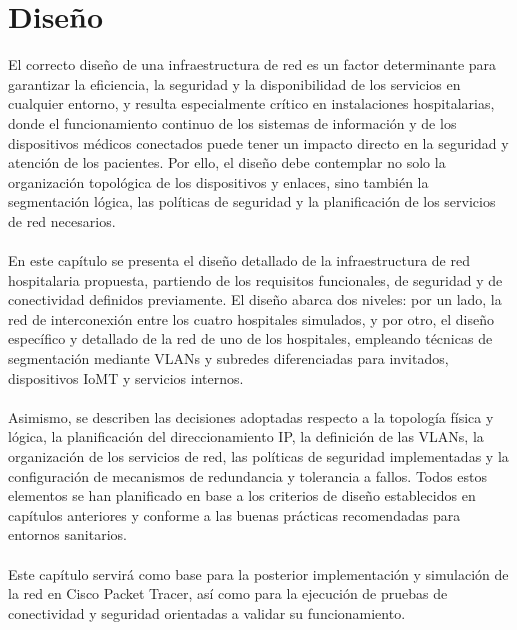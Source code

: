 
\chapter{Diseño}\label{diseño}
El correcto diseño de una infraestructura de red es un factor determinante para garantizar la eficiencia, la seguridad y la disponibilidad de los servicios en cualquier entorno,
y resulta especialmente crítico en instalaciones hospitalarias, donde el funcionamiento continuo de los sistemas de información y de los dispositivos médicos conectados puede 
tener un impacto directo en la seguridad y atención de los pacientes. Por ello, el diseño debe contemplar no solo la organización topológica de los dispositivos y enlaces, sino
también la segmentación lógica, las políticas de seguridad y la planificación de los servicios de red necesarios.
\\ \\
En este capítulo se presenta el diseño detallado de la infraestructura de red hospitalaria propuesta, partiendo de los requisitos funcionales, de seguridad y de conectividad 
definidos previamente. El diseño abarca dos niveles: por un lado, la red de interconexión entre los cuatro hospitales simulados, y por otro, el diseño específico y detallado 
de la red de uno de los hospitales, empleando técnicas de segmentación mediante VLANs y subredes diferenciadas para invitados, dispositivos IoMT y servicios internos.
\\ \\
Asimismo, se describen las decisiones adoptadas respecto a la topología física y lógica, la planificación del direccionamiento IP, la definición de las VLANs, la organización 
de los servicios de red, las políticas de seguridad implementadas y la configuración de mecanismos de redundancia y tolerancia a fallos. Todos estos elementos se han planificado
en base a los criterios de diseño establecidos en capítulos anteriores y conforme a las buenas prácticas recomendadas para entornos sanitarios.
\\ \\
Este capítulo servirá como base para la posterior implementación y simulación de la red en Cisco Packet Tracer, así como para la ejecución de pruebas de conectividad y 
seguridad orientadas a validar su funcionamiento.

